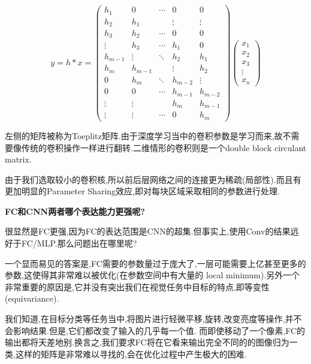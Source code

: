 \begin{equation}
	y=h * x=
	\begin{pmatrix}
		h_{1} & 0 & \cdots & 0 & 0 \\
		h_{2} & h_{1} & & \vdots & \vdots \\
		h_{3} & h_{2} & \cdots & 0 & 0 \\
		\vdots & h_{3} & \cdots & h_{1} & 0 \\
		h_{m-1} & \vdots & \ddots & h_{2} & h_{1} \\
		h_{m} & h_{m-1} & & \vdots & h_{2} \\
		0 & h_{m} & \ddots & h_{m-2} & \vdots \\
		0 & 0 & \cdots & h_{m-1} & h_{m-2} \\
		\vdots & \vdots & & h_{m} & h_{m-1}\\
		\vdots &\vdots & \cdots  &0 & h_{m}
	\end{pmatrix}
	\begin{pmatrix}
		x_{1} \\
		x_{2} \\
		x_{3} \\
		\vdots \\
		x_{n}
	\end{pmatrix}
\end{equation}

左侧的矩阵被称为Toeplitz矩阵.由于深度学习当中的卷积参数是学习而来,故不需要像传统的卷积操作一样进行翻转.二维情形的卷积则是一个double block circulant matrix.

由于我们选取较小的卷积核,所以前后层网络之间的连接更为稀疏(局部性).而且有更加明显的Parameter Sharing效应,即对每块区域采取相同的参数进行处理.

\textbf{FC和CNN两者哪个表达能力更强呢?}

很显然是FC更强,因为FC的表达范围是CNN的超集.但事实上,使用Conv的结果远好于FC/MLP.那么问题出在哪里呢?

一个显而易见的答案是,FC需要的参数量过于庞大了,一层可能需要上亿甚至更多的参数,这使得其非常难以被优化(在参数空间中有大量的 local minimum).另外一个非常重要的原因是,它并没有突出我们在视觉任务中目标的特点,即等变性 (equivariance).

我们知道,在目标分类等任务当中,将图片进行轻微平移,旋转,改变亮度等操作,并不会影响结果.但是,它们都改变了输入的几乎每一个值.
而即使移动了一个像素,FC的输出都将天差地别.换言之,我们要求FC将在它看来输出完全不同的的图像归为一类,这样的矩阵是非常难以寻找的,会在优化过程中产生极大的困难.

